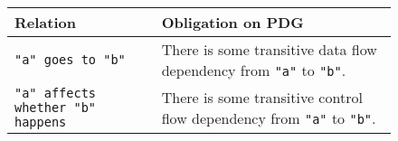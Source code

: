 


\begin{figure}[t]
    \small
    \begin{tabular}{|p{5.5cm}|p{8cm}|}
        \hline
        \syslang{} Relation                                                       &  Obligation on PDG                   \\ \hline
        \lstinline[language=CNL]|"a" goes to "b"|                                 &  There is some transitive data flow dependency from
                                                                                    \lstinline[language=CNL]|"a"| to \lstinline[language=CNL]|"b"|. \\
        \hline
        \lstinline[language=CNL]|"a" affects whether "b" happens|                 & There is some transitive control flow dependency from
                                                                                    \lstinline[language=CNL]|"a"| to \lstinline[language=CNL]|"b"|. \\
        

\end{tabular}
\end{figure}
